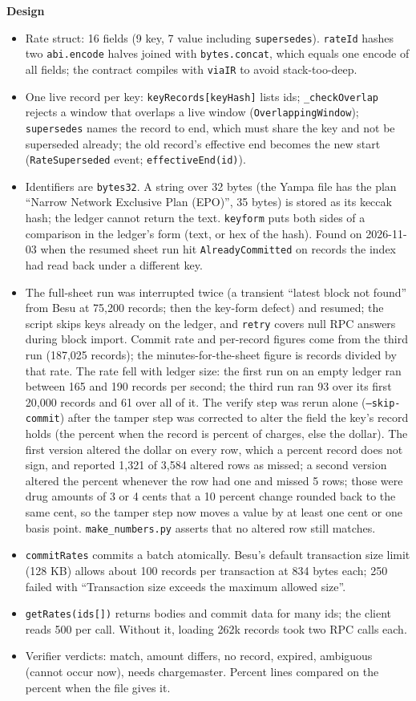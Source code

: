 \textbf{Design}
\begin{itemize}
\item Rate struct: 16 fields (9 key, 7 value including \texttt{supersedes}). \texttt{rateId} hashes two \texttt{abi.encode} halves joined with \texttt{bytes.concat}, which equals one encode of all fields; the contract compiles with \texttt{viaIR} to avoid stack-too-deep.
\item One live record per key: \texttt{keyRecords[keyHash]} lists ids; \texttt{\_checkOverlap} rejects a window that overlaps a live window (\texttt{OverlappingWindow}); \texttt{supersedes} names the record to end, which must share the key and not be superseded already; the old record's effective end becomes the new start (\texttt{RateSuperseded} event; \texttt{effectiveEnd(id)}).
\item Identifiers are \texttt{bytes32}. A string over 32 bytes (the Yampa file has the plan ``Narrow Network Exclusive Plan (EPO)'', 35 bytes) is stored as its keccak hash; the ledger cannot return the text. \texttt{keyform} puts both sides of a comparison in the ledger's form (text, or hex of the hash). Found on 2026-11-03 when the resumed sheet run hit \texttt{AlreadyCommitted} on records the index had read back under a different key.
\item The full-sheet run was interrupted twice (a transient ``latest block not found'' from Besu at 75,200 records; then the key-form defect) and resumed; the script skips keys already on the ledger, and \texttt{retry} covers null RPC answers during block import. Commit rate and per-record figures come from the third run (187,025 records); the minutes-for-the-sheet figure is records divided by that rate. The rate fell with ledger size: the first run on an empty ledger ran between 165 and 190 records per second; the third run ran 93 over its first 20,000 records and 61 over all of it. The verify step was rerun alone (\texttt{--skip-commit}) after the tamper step was corrected to alter the field the key's record holds (the percent when the record is percent of charges, else the dollar). The first version altered the dollar on every row, which a percent record does not sign, and reported 1,321 of 3,584 altered rows as missed; a second version altered the percent whenever the row had one and missed 5 rows; those were drug amounts of 3 or 4 cents that a 10 percent change rounded back to the same cent, so the tamper step now moves a value by at least one cent or one basis point. \texttt{make\_numbers.py} asserts that no altered row still matches.
\item \texttt{commitRates} commits a batch atomically. Besu's default transaction size limit (128 KB) allows about 100 records per transaction at 834 bytes each; 250 failed with ``Transaction size exceeds the maximum allowed size''.
\item \texttt{getRates(ids[])} returns bodies and commit data for many ids; the client reads 500 per call. Without it, loading 262k records took two RPC calls each.
\item Verifier verdicts: match, amount differs, no record, expired, ambiguous (cannot occur now), needs chargemaster. Percent lines compared on the percent when the file gives it.
\end{itemize}

